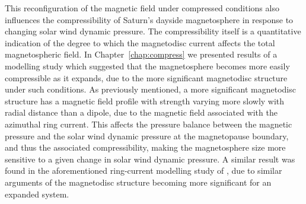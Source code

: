 This reconfiguration of the magnetic field under compressed conditions also influences the compressibility of Saturn's dayside magnetosphere in response to changing solar wind dynamic pressure. The compressibility itself is a quantitative indication of the degree to which the magnetodisc current affects the total magnetospheric field. In Chapter~\ref{chap:compress} we presented results of a modelling study which suggested that the magnetosphere becomes more easily compressible as it expands, due to the more significant magnetodisc structure under such conditions. As previously mentioned, a more significant magnetodisc structure has a magnetic field profile with strength varying more slowly with radial distance than a dipole, due to the magnetic field associated with the azimuthal ring current. This affects the pressure balance between the magnetic pressure and the solar wind dynamic pressure at the magnetopause boundary, and thus the associated compressibility, making the magnetosphere size more sensitive to a given change in solar wind dynamic pressure. A similar result was found in the aforementioned ring-current modelling study of \citet{bunce2007}, due to similar arguments of the magnetodisc structure becoming more significant for an expanded system.


